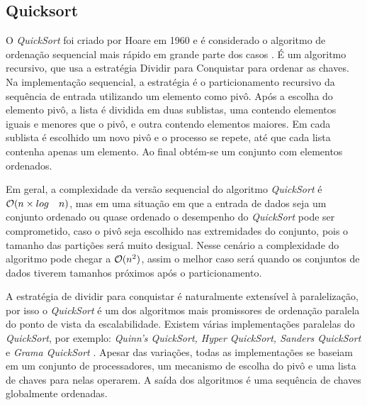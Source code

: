 \subsection{Quicksort}



O \textit{QuickSort} foi criado por Hoare em 1960 e é considerado o algoritmo de ordenação sequencial mais rápido em grande parte dos casos \cite{Cormen:2009}. É um algoritmo recursivo, que usa a estratégia Dividir para Conquistar para ordenar as chaves.
Na implementação sequencial, a estratégia é o particionamento recursivo da sequência de entrada utilizando um elemento como pivô.  
Após a escolha do elemento pivô, a lista é dividida em duas sublistas, uma contendo elementos iguais e menores que o pivô,  e outra contendo elementos maiores.
Em cada sublista é escolhido um novo pivô e o processo se repete, até que cada lista contenha apenas um elemento.  Ao final obtém-se um conjunto com elementos ordenados. 

Em geral, a complexidade da versão sequencial do algoritmo \textit{QuickSort} é ${\cal O}(n \times log \quad n)$, mas em uma situação em que a entrada de dados seja um  conjunto ordenado ou quase ordenado o desempenho do \textit{QuickSort} pode ser comprometido, caso o pivô seja escolhido nas extremidades do conjunto, pois o tamanho das partições será muito desigual. Nesse cenário a complexidade do algoritmo pode chegar a ${\cal O}(n^2)$, assim o melhor caso será quando os conjuntos de dados tiverem tamanhos próximos após o particionamento.
 
 
 
A estratégia de dividir para conquistar é naturalmente extensível à paralelização, por isso o \textit{QuickSort} é um dos algoritmos mais promissores de ordenação paralela do ponto de vista da escalabilidade.
Existem várias implementações paralelas do \textit{QuickSort}, por exemplo: \textit{Quinn's QuickSort, Hyper QuickSort, Sanders QuickSort} e  \textit{Grama QuickSort} \cite{Quinn:1994, Sanders:1997}. Apesar das variações, todas as implementações se baseiam em um conjunto de processadores, um mecanismo de escolha do pivô e uma lista de chaves para nelas operarem. A saída dos algoritmos é uma sequência de chaves globalmente ordenadas. 

